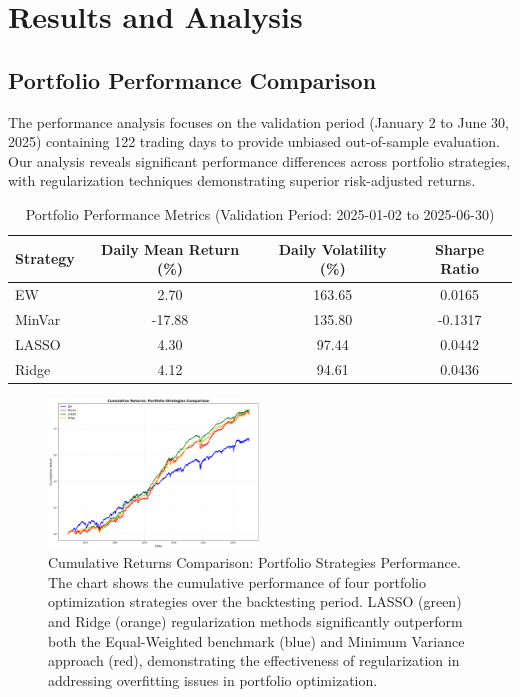 \documentclass[12pt]{article}
\begin{document}
\section{Results and Analysis}

\subsection{Portfolio Performance Comparison}
The performance analysis focuses on the validation period (January 2 to June 30, 2025) containing 122 trading days to provide unbiased out-of-sample evaluation. Our analysis reveals significant performance differences across portfolio strategies, with regularization techniques demonstrating superior risk-adjusted returns.


\begin{table}[H]
\centering
\caption{Portfolio Performance Metrics (Validation Period: 2025-01-02 to 2025-06-30)}
\label{tab:performance}
\begin{tabular}{lccc}
\toprule
Strategy & Daily Mean Return (\%) & Daily Volatility (\%) & Sharpe Ratio \\
\midrule
EW & 2.70 & 163.65 & 0.0165 \\
MinVar & -17.88 & 135.80 & -0.1317 \\
LASSO & 4.30 & 97.44 & 0.0442 \\
Ridge & 4.12 & 94.61 & 0.0436 \\
\bottomrule
\end{tabular}
\end{table}

\begin{figure}[H]
\centering
\includegraphics[width=0.5\textwidth]{figure1.png}
\caption{Cumulative Returns Comparison: Portfolio Strategies Performance. The chart shows the cumulative performance of four portfolio optimization strategies over the backtesting period. LASSO (green) and Ridge (orange) regularization methods significantly outperform both the Equal-Weighted benchmark (blue) and Minimum Variance approach (red), demonstrating the effectiveness of regularization in addressing overfitting issues in portfolio optimization.}
\label{fig:cumulative_returns}
\end{figure}
\end{document}
